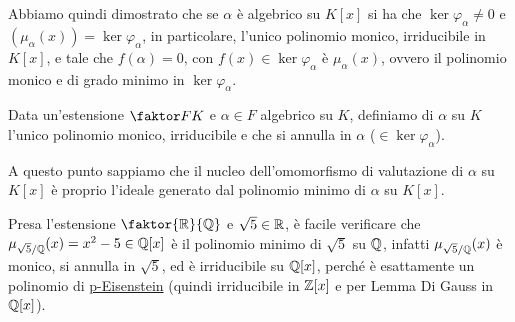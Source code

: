 \documentclass[11pt]{scrartcl}
\begin{document}
 Abbiamo quindi dimostrato che se $\alpha$ è algebrico su $K[x]$ si ha che $\ker\varphi_\alpha \ne 0$ e $(\mu_\alpha (x)) = \ker\varphi_\alpha$, in particolare, l'unico polinomio monico, irriducibile in $K[x]$, e tale che $f(\alpha) = 0$, con $f(x) \in \ker\varphi_\alpha$ è $\mu_\alpha (x)$, ovvero il polinomio monico e di grado minimo in $\ker\varphi_\alpha$.

\begin{definition}
Data un'estensione $\faktor FK$ e $\alpha \in F$ algebrico su $K$, definiamo  di $\alpha$ su $K$ l'unico polinomio monico, irriducibile e che si annulla in $\alpha$ ($\in \ker\varphi_\alpha$).
\end{definition}

A questo punto sappiamo che il nucleo dell'omomorfismo di valutazione di $\alpha$ su $K[x]$ è proprio l'ideale generato dal polinomio minimo di $\alpha$ su $K[x]$.

\begin{example}
Presa l'estensione $\faktor{\RR}{\QQ}$ e $\sqrt 5 \in \mathbb R$, è facile verificare che $\mu_{\sqrt 5/\mathbb Q}(x) = x^2 - 5 \in \mathbb Q[x]$ è il polinomio minimo di $\sqrt 5$ su $\mathbb Q$, infatti $\mu_{\sqrt 5/\mathbb Q}(x)$ è monico, si annulla in $\sqrt 5$, ed è irriducibile su $\mathbb Q[x]$, perché è esattamente un polinomio di \hyperref[p:pE]{p-Eisenstein} (quindi irriducibile in $\mathbb Z[x]$ e per Lemma Di Gauss in $\mathbb Q[x]$).
\end{example}
\end{document}
